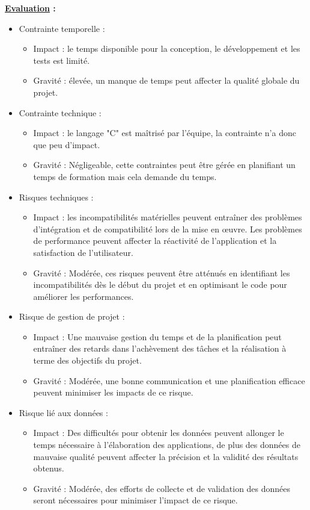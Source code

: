 \documentclass[a4paper, 12pt]{report}
\begin{document}
\textbf{\underline{Evaluation} :}
\begin{itemize}
    \item Contrainte temporelle :
          \begin{itemize}
              \item Impact : le temps disponible pour la conception, le développement et les tests est limité.
              \item Gravité : élevée, un manque de temps peut affecter la qualité globale du projet.
          \end{itemize}
    \item Contrainte technique :
          \begin{itemize}
              \item Impact : le langage "C" est maîtrisé par l'équipe, la contrainte n'a donc que peu d'impact.
              \item Gravité : Négligeable, cette contraintes peut être gérée en planifiant un temps de formation mais cela demande du temps.
          \end{itemize}
          \clearpage %

    \item Risques techniques :
          \begin{itemize}
              \item Impact : les incompatibilités matérielles peuvent entraîner des problèmes d'intégration et de compatibilité lors de la mise en œuvre. Les problèmes de performance peuvent affecter la réactivité de l'application et la satisfaction de l'utilisateur.
              \item Gravité : Modérée, ces risques peuvent être atténués en identifiant les incompatibilités dès le début du projet et en optimisant le code pour améliorer les performances.
          \end{itemize}
    \item Risque de gestion de projet :
          \begin{itemize}
              \item Impact : Une mauvaise gestion du temps et de la planification peut entraîner des retards dans l'achèvement des tâches et la réalisation à terme des objectifs du projet.
              \item Gravité : Modérée, une bonne communication et une planification efficace peuvent minimiser les impacts de ce risque.
          \end{itemize}
    \item Risque lié aux données :
          \begin{itemize}
              \item Impact : Des difficultés pour obtenir les données peuvent allonger le temps nécessaire à l'élaboration des applications, de plus des données de mauvaise qualité peuvent affecter la précision et la validité des résultats obtenus.
              \item Gravité : Modérée, des efforts de collecte et de validation des données seront nécessaires pour minimiser l'impact de ce risque.
          \end{itemize}
\end{itemize}
\end{document}
